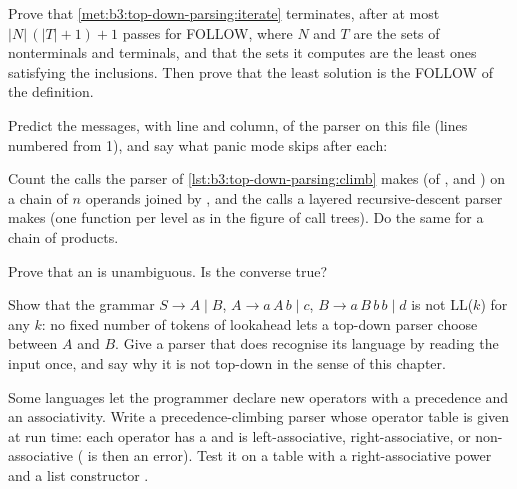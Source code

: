 \begin{exercise}[$\star\star$]\label{exo:b3:top-down-parsing:7}
Prove that \cref{met:b3:top-down-parsing:iterate} terminates, after at most $|N|\,(|T| + 1) + 1$ passes for FOLLOW, where $N$ and $T$ are the sets of nonterminals and terminals, and that the sets it computes are the least ones satisfying the inclusions. Then prove that the least solution is the FOLLOW of the definition.
\end{exercise}

\begin{exercise}[$\star\star$]\label{exo:b3:top-down-parsing:8}
Predict the messages, with line and column, of the parser on this file (lines numbered from 1), and say what panic mode skips after each:
\label{lst:b3:top-down-parsing:ex8}
\end{exercise}

\begin{exercise}[$\star\star$]\label{exo:b3:top-down-parsing:9}
Count the calls the parser of \cref{lst:b3:top-down-parsing:climb} makes (of ,  and ) on a chain of $n$ operands joined by \code{+}, and the calls a layered recursive-descent parser makes (one function per level as in the figure of call trees). Do the same for a chain of products.
\end{exercise}

\begin{exercise}[$\star\star\star$]\label{exo:b3:top-down-parsing:10}
Prove that an  is unambiguous. Is the converse true?
\end{exercise}

\begin{exercise}[$\star\star\star$]\label{exo:b3:top-down-parsing:11}
Show that the grammar $S \to A \mid B$, $A \to a\,A\,b \mid c$, $B \to a\,B\,b\,b \mid d$ is not LL($k$) for any $k$: no fixed number of tokens of lookahead lets a top-down parser choose between $A$ and $B$. Give a parser that does recognise its language by reading the input once, and say why it is not top-down in the sense of this chapter.
\end{exercise}

\begin{exercise}[$\star\star\star$]\label{exo:b3:top-down-parsing:12}
Some languages let the programmer declare new operators with a precedence and an associativity. Write a precedence-climbing parser whose operator table is given at run time: each operator has a  and is left-associative, right-associative, or non-associative ( is then an error). Test it on a table with a right-associative power and a list constructor \code{::}.
\end{exercise}

